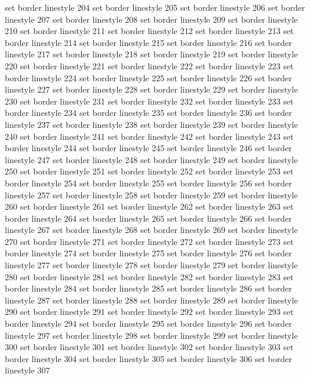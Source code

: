 set border linestyle 204
set border linestyle 205
set border linestyle 206
set border linestyle 207
set border linestyle 208
set border linestyle 209
set border linestyle 210
set border linestyle 211
set border linestyle 212
set border linestyle 213
set border linestyle 214
set border linestyle 215
set border linestyle 216
set border linestyle 217
set border linestyle 218
set border linestyle 219
set border linestyle 220
set border linestyle 221
set border linestyle 222
set border linestyle 223
set border linestyle 224
set border linestyle 225
set border linestyle 226
set border linestyle 227
set border linestyle 228
set border linestyle 229
set border linestyle 230
set border linestyle 231
set border linestyle 232
set border linestyle 233
set border linestyle 234
set border linestyle 235
set border linestyle 236
set border linestyle 237
set border linestyle 238
set border linestyle 239
set border linestyle 240
set border linestyle 241
set border linestyle 242
set border linestyle 243
set border linestyle 244
set border linestyle 245
set border linestyle 246
set border linestyle 247
set border linestyle 248
set border linestyle 249
set border linestyle 250
set border linestyle 251
set border linestyle 252
set border linestyle 253
set border linestyle 254
set border linestyle 255
set border linestyle 256
set border linestyle 257
set border linestyle 258
set border linestyle 259
set border linestyle 260
set border linestyle 261
set border linestyle 262
set border linestyle 263
set border linestyle 264
set border linestyle 265
set border linestyle 266
set border linestyle 267
set border linestyle 268
set border linestyle 269
set border linestyle 270
set border linestyle 271
set border linestyle 272
set border linestyle 273
set border linestyle 274
set border linestyle 275
set border linestyle 276
set border linestyle 277
set border linestyle 278
set border linestyle 279
set border linestyle 280
set border linestyle 281
set border linestyle 282
set border linestyle 283
set border linestyle 284
set border linestyle 285
set border linestyle 286
set border linestyle 287
set border linestyle 288
set border linestyle 289
set border linestyle 290
set border linestyle 291
set border linestyle 292
set border linestyle 293
set border linestyle 294
set border linestyle 295
set border linestyle 296
set border linestyle 297
set border linestyle 298
set border linestyle 299
set border linestyle 300
set border linestyle 301
set border linestyle 302
set border linestyle 303
set border linestyle 304
set border linestyle 305
set border linestyle 306
set border linestyle 307
